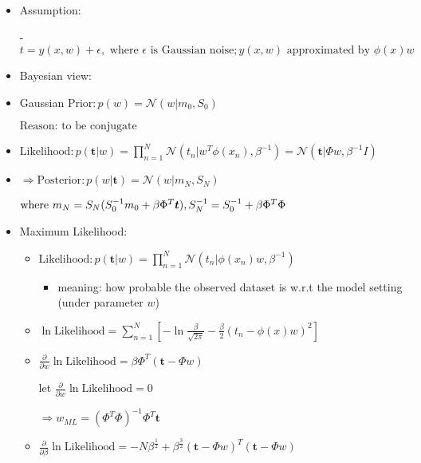 \begin{itemize}

\item Assumption:

- $t=y(x,w)+\epsilon,\text{ where } \epsilon \text{ is Gaussian noise}; y(x,w)\text{ approximated by }\phi(x)w$ 

\item Bayesian view:

\item Gaussian $\text{Prior}: p(w) = \mathcal N(w|m_0,S_0)$ 

	$\text{Reason: to be conjugate}$ 

\item $\text{Likelihood}: \displaystyle p(\boldsymbol t|w) = \prod_{n=1}^N\mathcal N(t_n|w^T\phi(x_n),\beta^{-1}) = \mathcal N(\boldsymbol t|\Phi w,\beta^{-1}I)$ 

\item $\Rightarrow \text{Posterior}: p(w|\boldsymbol t) = \mathcal N(w|m_N,S_N)$ 

	$\text{where } m_N = S_N(S_0^{-1}m_0+\beta \Phi^T\boldsymbol t),\space S_N^{-1} = S_0^{-1}+\beta \Phi^T\Phi $ 

\item Maximum Likelihood:

	\begin{itemize}
	
	\item $\text{Likelihood}: \displaystyle p(\boldsymbol t|w) = \prod_{n=1}^N\mathcal N(t_n|\phi(x_n)w,\beta^{-1})$ 
		\begin{itemize}
		\item meaning: how probable the observed dataset is w.r.t the model setting (under parameter $w$)
		\end{itemize}
	
	\item $\displaystyle \ln \text{Likelihood} = \sum_{n=1}^N [-\ln \frac {\beta} {\sqrt {2\pi}} - \frac \beta 2 (t_n-\phi(x)w)^2]$ 
	
	\item $\displaystyle \frac {\partial} {\partial w} \ln \text{Likelihood} = \beta \Phi^T(\boldsymbol t-\Phi w)$ 
	
	let $\frac {\partial} {\partial w} \ln \text{Likelihood}=0$ 
	
	$\displaystyle \Rightarrow w_{ML} = (\Phi^T\Phi)^{-1} \Phi^T\boldsymbol t $ 
	
	\item $\displaystyle \frac {\partial} {\partial \beta} \ln \text{Likelihood} = -N\beta^{\frac 1 2} + \beta^{\frac 3 2}(\boldsymbol t-\Phi w)^T(\boldsymbol t-\Phi w) $  
	

\end{itemize}
\end{itemize}
